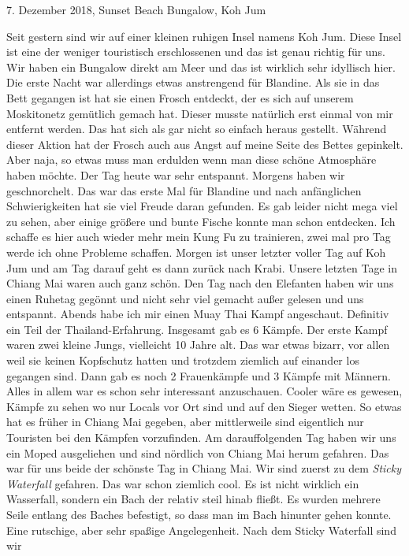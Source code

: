 \documentclass[11pt]{book}
\begin{document}
7. Dezember 2018, Sunset Beach Bungalow, Koh Jum 

Seit gestern sind wir auf einer kleinen ruhigen Insel namens Koh Jum. Diese Insel ist eine der weniger touristisch erschlossenen 
und das ist genau richtig für uns. Wir haben ein Bungalow direkt am Meer und das ist wirklich sehr idyllisch hier. Die erste Nacht 
war allerdings etwas anstrengend für Blandine. Als sie in das Bett gegangen ist hat sie einen Frosch entdeckt, der es sich auf 
unserem Moskitonetz gemütlich gemach hat. Dieser musste natürlich erst einmal von mir entfernt werden. Das hat sich als gar nicht 
so einfach heraus gestellt. Während dieser Aktion hat der Frosch auch aus Angst auf meine Seite des Bettes gepinkelt. Aber naja, 
so etwas muss man erdulden wenn man diese schöne Atmosphäre haben möchte. Der Tag heute war sehr entspannt. Morgens haben wir 
geschnorchelt. Das war das erste Mal für Blandine und nach anfänglichen Schwierigkeiten hat sie viel Freude daran gefunden. Es 
gab leider nicht mega viel zu sehen, aber einige größere und bunte Fische konnte man schon entdecken. Ich schaffe es hier auch wieder 
mehr mein Kung Fu zu trainieren, zwei mal pro Tag werde ich ohne Probleme schaffen. Morgen ist unser letzter voller Tag auf Koh Jum 
und am Tag darauf geht es dann zurück nach Krabi. 
Unsere letzten Tage in Chiang Mai waren auch ganz schön. Den Tag nach den Elefanten haben wir uns einen Ruhetag gegönnt und 
nicht sehr viel gemacht außer gelesen und uns entspannt. Abends habe ich mir einen Muay Thai Kampf angeschaut. Definitiv ein 
Teil der Thailand-Erfahrung. Insgesamt gab es 6 Kämpfe. Der erste Kampf waren zwei kleine Jungs, vielleicht 10 Jahre alt. Das 
war etwas bizarr, vor allen weil sie keinen Kopfschutz hatten und trotzdem ziemlich auf einander los gegangen sind. Dann gab es 
noch 2 Frauenkämpfe und 3 Kämpfe mit Männern. Alles in allem war es schon sehr interessant anzuschauen. Cooler wäre es gewesen, 
Kämpfe zu sehen wo nur Locals vor Ort sind und auf den Sieger wetten. So etwas hat es früher in Chiang Mai gegeben, aber mittlerweile 
sind eigentlich nur Touristen bei den Kämpfen vorzufinden. 
Am darauffolgenden Tag haben wir uns ein Moped ausgeliehen und sind nördlich von Chiang Mai herum gefahren. Das war für uns beide 
der schönste Tag in Chiang Mai. Wir sind zuerst zu dem \emph{Sticky Waterfall} gefahren. Das war schon ziemlich cool. Es ist nicht 
wirklich ein Wasserfall, sondern ein Bach der relativ steil hinab fließt. Es wurden mehrere Seile entlang des Baches befestigt, 
so dass man im Bach hinunter gehen konnte. Eine rutschige, aber sehr spaßige Angelegenheit. Nach dem Sticky Waterfall sind wir 
\end{document}

